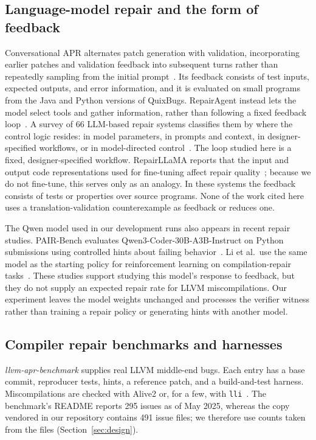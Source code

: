 \documentclass[conference]{IEEEtran}
\begin{document}
\subsection{Language-model repair and the form of feedback}

Conversational APR alternates patch generation with validation, incorporating earlier patches and validation feedback into subsequent turns rather than repeatedly sampling from the initial prompt~\cite{xia2023conversational}. Its feedback consists of test inputs, expected outputs, and error information, and it is evaluated on small programs from the Java and Python versions of QuixBugs. RepairAgent instead lets the model select tools and gather information, rather than following a fixed feedback loop~\cite{bouzenia2025repairagent}. A survey of 66 LLM-based repair systems classifies them by where the control logic resides: in model parameters, in prompts and context, in designer-specified workflows, or in model-directed control~\cite{yang2026survey}. The loop studied here is a fixed, designer-specified workflow. RepairLLaMA reports that the input and output code representations used for fine-tuning affect repair quality~\cite{silva2025repairllama}; because we do not fine-tune, this serves only as an analogy. In these systems the feedback consists of tests or properties over source programs. None of the work cited here uses a translation-validation counterexample as feedback or reduces one.

The Qwen model used in our development runs also appears in recent repair studies. PAIR-Bench evaluates Qwen3-Coder-30B-A3B-Instruct on Python submissions using controlled hints about failing behavior~\cite{le2026pairbench}. Li et al.\ use the same model as the starting policy for reinforcement learning on compilation-repair tasks~\cite{li2026signal}. These studies support studying this model's response to feedback, but they do not supply an expected repair rate for LLVM miscompilations. Our experiment leaves the model weights unchanged and processes the verifier witness rather than training a repair policy or generating hints with another model.

\subsection{Compiler repair benchmarks and harnesses}

\emph{llvm-apr-benchmark} supplies real LLVM middle-end bugs. Each entry has a base commit, reproducer tests, hints, a reference patch, and a build-and-test harness. Miscompilations are checked with Alive2 or, for a few, with \texttt{lli}~\cite{zheng2025aprbench}. The benchmark's README reports 295 issues as of May 2025, whereas the copy vendored in our repository contains 491 issue files; we therefore use counts taken from the files (Section~\ref{sec:design}).
\end{document}
